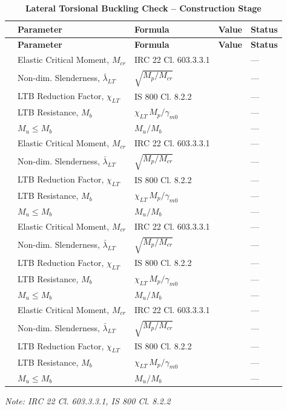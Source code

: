 \documentclass[12pt,a4paper]{report}
\numberwithin{table}{chapter}
\numberwithin{figure}{chapter}
\begin{document}
\vspace{1em}
\begin{longtable}{|C{2.5cm}|C{3.5cm}|C{3.5cm}|>{\centering\arraybackslash}p{4.2cm}|C{1.8cm}|}
\caption{\textbf{Lateral Torsional Buckling Check -- Construction Stage}}
\hline
{} \textbf{} & \textbf{Parameter} & \textbf{Formula} & \textbf{Value} & \textbf{Status} \\[6pt]
\hline
\endfirsthead
\hline
{} \textbf{} & \textbf{Parameter} & \textbf{Formula} & \textbf{Value} & \textbf{Status} \\[6pt]
\hline
\endhead
{} & Elastic Critical Moment, $M_{cr}$ & IRC 22 Cl. 603.3.3.1 &  & --- \\[6pt]
 & Non-dim. Slenderness, $\bar{\lambda}_{LT}$ & $\sqrt{M_p / M_{cr}}$ &  & --- \\[6pt]
 & LTB Reduction Factor, $\chi_{LT}$ & IS 800 Cl. 8.2.2 &  & --- \\[6pt]
 & LTB Resistance, $M_b$ & $\chi_{LT}\,M_p / \gamma_{m0}$ &  & --- \\[6pt]
 & $M_u \leq M_b$ & $M_u / M_b$ &  & --- \\[6pt]
\hline
{} & Elastic Critical Moment, $M_{cr}$ & IRC 22 Cl. 603.3.3.1 &  & --- \\[6pt]
 & Non-dim. Slenderness, $\bar{\lambda}_{LT}$ & $\sqrt{M_p / M_{cr}}$ &  & --- \\[6pt]
 & LTB Reduction Factor, $\chi_{LT}$ & IS 800 Cl. 8.2.2 &  & --- \\[6pt]
 & LTB Resistance, $M_b$ & $\chi_{LT}\,M_p / \gamma_{m0}$ &  & --- \\[6pt]
 & $M_u \leq M_b$ & $M_u / M_b$ &  & --- \\[6pt]
\hline
{} & Elastic Critical Moment, $M_{cr}$ & IRC 22 Cl. 603.3.3.1 &  & --- \\[6pt]
 & Non-dim. Slenderness, $\bar{\lambda}_{LT}$ & $\sqrt{M_p / M_{cr}}$ &  & --- \\[6pt]
 & LTB Reduction Factor, $\chi_{LT}$ & IS 800 Cl. 8.2.2 &  & --- \\[6pt]
 & LTB Resistance, $M_b$ & $\chi_{LT}\,M_p / \gamma_{m0}$ &  & --- \\[6pt]
 & $M_u \leq M_b$ & $M_u / M_b$ &  & --- \\[6pt]
\hline
{} & Elastic Critical Moment, $M_{cr}$ & IRC 22 Cl. 603.3.3.1 &  & --- \\[6pt]
 & Non-dim. Slenderness, $\bar{\lambda}_{LT}$ & $\sqrt{M_p / M_{cr}}$ &  & --- \\[6pt]
 & LTB Reduction Factor, $\chi_{LT}$ & IS 800 Cl. 8.2.2 &  & --- \\[6pt]
 & LTB Resistance, $M_b$ & $\chi_{LT}\,M_p / \gamma_{m0}$ &  & --- \\[6pt]
 & $M_u \leq M_b$ & $M_u / M_b$ &  & --- \\[6pt]
\hline
\end{longtable}
\noindent\textit{Note: IRC 22 Cl. 603.3.3.1, IS 800 Cl. 8.2.2}
\end{document}
